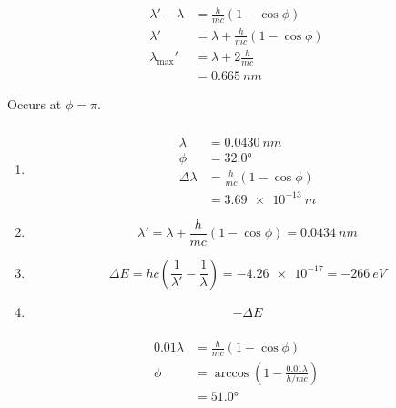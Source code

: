 \documentclass{article}
\begin{document}
\setcounter{subsubsection}{16}
\subsubsection{}

\begin{align*}
  \lambda' - \lambda  & = \frac{h}{m c} (1 - \cos \phi)           \\
  \lambda'            & = \lambda + \frac{h}{m c} (1 - \cos \phi) \\
  \lambda_\text{max}' & = \lambda + 2 \frac{h}{m c}               \\
                      & = \qty{0.665}{nm}
\end{align*}

Occurs at $\phi = \pi$.

\setcounter{subsubsection}{18}
\subsubsection{}

\begin{enumerate}
  \item

        \begin{align*}
          \lambda        & = \qty{0.0430}{nm}              \\
          \phi           & = \ang{32.0}                    \\
          \Delta \lambda & = \frac{h}{m c} (1 - \cos \phi) \\
                         & = \qty{3.69e-13}{m}
        \end{align*}

  \item \[\lambda' = \lambda + \frac{h}{m c} (1 - \cos \phi) = \qty{0.0434}{nm}\]

  \item \[\Delta E = h c \left( \frac{1}{\lambda'} - \frac{1}{\lambda} \right) = \qty{-4.26e-17} = \qty{-266}{eV}\]

  \item \[-\Delta E\]
\end{enumerate}

\setcounter{subsubsection}{20}
\subsubsection{}

\begin{align*}
  0.01 \lambda & = \frac{h}{m c} (1 - \cos \phi)                           \\
  \phi         & = \arccos \left( 1 - \frac{0.01 \lambda}{h / m c} \right) \\
               & = \ang{51.0}
\end{align*}
\end{document}
